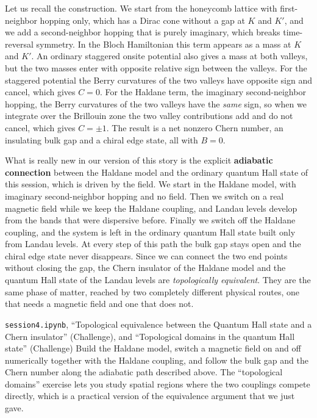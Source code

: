 Let us recall the construction. We start from the honeycomb lattice with first-neighbor hopping
only, which has a Dirac cone without a gap at $K$ and $K'$, and we add a second-neighbor hopping
that is purely imaginary, which breaks time-reversal symmetry. In the Bloch Hamiltonian this term
appears as a mass at $K$ and $K'$. An ordinary staggered onsite potential also gives a mass at
both valleys, but the two masses enter with opposite relative sign between the valleys. For the
staggered potential the Berry curvatures of the two valleys have opposite sign and cancel, which
gives $C=0$. For the Haldane term, the imaginary second-neighbor hopping, the Berry curvatures of
the two valleys have the \emph{same} sign, so when we integrate over the Brillouin zone the two
valley contributions add and do not cancel, which gives $C=\pm1$. The result is a net nonzero
Chern number, an insulating bulk gap and a chiral edge state, all with $B=0$.

What is really new in our version of this story is the explicit \textbf{adiabatic connection}
between the Haldane model and the ordinary quantum Hall state of this session, which is driven by
the field. We start in the Haldane model, with imaginary second-neighbor hopping and no field.
Then we switch on a real magnetic field while we keep the Haldane coupling, and Landau levels
develop from the bands that were dispersive before. Finally we switch off the Haldane coupling,
and the system is left in the ordinary quantum Hall state built only from Landau levels. At every
step of this path the bulk gap stays open and the chiral edge state never disappears. Since we can
connect the two end points without closing the gap, the Chern insulator of the Haldane model and
the quantum Hall state of the Landau levels are \emph{topologically equivalent}. They are the same
phase of matter, reached by two completely different physical routes, one that needs a magnetic
field and one that does not.

\begin{notebookbox}{\texttt{session4.ipynb}, ``Topological equivalence between the Quantum Hall state and a Chern insulator'' (Challenge), and ``Topological domains in the quantum Hall state'' (Challenge)}
Build the Haldane model, switch a magnetic field on and off numerically together with the Haldane
coupling, and follow the bulk gap and the Chern number along the adiabatic path described above.
The ``topological domains'' exercise lets you study spatial regions where the two couplings
compete directly, which is a practical version of the equivalence argument that we just gave.
\end{notebookbox}

